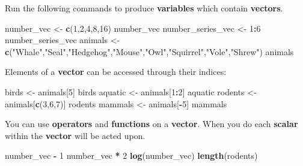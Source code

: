 \documentclass[]{book}
\newenvironment{Shaded}{\begin{snugshade}}{\end{snugshade}}
\newcommand{\KeywordTok}[1]{\textcolor[rgb]{0.13,0.29,0.53}{\textbf{#1}}}
\newcommand{\DecValTok}[1]{\textcolor[rgb]{0.00,0.00,0.81}{#1}}
\newcommand{\StringTok}[1]{\textcolor[rgb]{0.31,0.60,0.02}{#1}}
\newcommand{\OperatorTok}[1]{\textcolor[rgb]{0.81,0.36,0.00}{\textbf{#1}}}
\newcommand{\NormalTok}[1]{#1}
\begin{document}
Run the following commands to produce \textbf{variables} which contain
\textbf{vectors}.

\begin{Shaded}
\begin{Highlighting}[]
\NormalTok{number_vec <-}\StringTok{ }\KeywordTok{c}\NormalTok{(}\DecValTok{1}\NormalTok{,}\DecValTok{2}\NormalTok{,}\DecValTok{4}\NormalTok{,}\DecValTok{8}\NormalTok{,}\DecValTok{16}\NormalTok{)}
\NormalTok{number_vec}
\NormalTok{number_series_vec <-}\StringTok{ }\DecValTok{1}\OperatorTok{:}\DecValTok{6}
\NormalTok{number_series_vec}
\NormalTok{animals <-}\StringTok{ }\KeywordTok{c}\NormalTok{(}\StringTok{"Whale"}\NormalTok{,}\StringTok{"Seal"}\NormalTok{,}\StringTok{"Hedgehog"}\NormalTok{,}\StringTok{"Mouse"}\NormalTok{,}\StringTok{"Owl"}\NormalTok{,}\StringTok{"Squirrel"}\NormalTok{,}\StringTok{"Vole"}\NormalTok{,}\StringTok{"Shrew"}\NormalTok{)}
\NormalTok{animals}
\end{Highlighting}
\end{Shaded}

Elements of a \textbf{vector} can be accessed through their indices:

\begin{Shaded}
\begin{Highlighting}[]
\NormalTok{birds <-}\StringTok{ }\NormalTok{animals[}\DecValTok{5}\NormalTok{]}
\NormalTok{birds}
\NormalTok{aquatic <-}\StringTok{ }\NormalTok{animals[}\DecValTok{1}\OperatorTok{:}\DecValTok{2}\NormalTok{]}
\NormalTok{aquatic}
\NormalTok{rodents <-}\StringTok{ }\NormalTok{animals[}\KeywordTok{c}\NormalTok{(}\DecValTok{3}\NormalTok{,}\DecValTok{6}\NormalTok{,}\DecValTok{7}\NormalTok{)]}
\NormalTok{rodents}
\NormalTok{mammals <-}\StringTok{ }\NormalTok{animals[}\OperatorTok{-}\DecValTok{5}\NormalTok{]}
\NormalTok{mammals}
\end{Highlighting}
\end{Shaded}

You can use \textbf{operators} and \textbf{functions} on a
\textbf{vector}. When you do each \textbf{scalar} within the
\textbf{vector} will be acted upon.

\begin{Shaded}
\begin{Highlighting}[]
\NormalTok{number_vec }\OperatorTok{-}\StringTok{ }\DecValTok{1}
\NormalTok{number_vec }\OperatorTok{*}\StringTok{ }\DecValTok{2}
\KeywordTok{log}\NormalTok{(number_vec)}
\KeywordTok{length}\NormalTok{(rodents)}
\end{Highlighting}
\end{Shaded}
\end{document}
